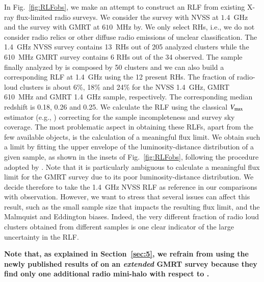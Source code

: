 \documentclass[useAMS,usenatbib]{mn2e}
\begin{document}
\begin{appendix}
In Fig.~\ref{fig:RLFobs}, we make an attempt to construct an RLF from existing
X-ray flux-limited radio surveys. We consider the
\cite{1999NewA....4..141G} survey with NVSS at $1.4$~GHz and the
\cite{VenturiGMRT_1,VenturiGMRT_2} survey with GMRT at $610$~MHz by. We only
select RHs, i.e., we do not consider radio relics or other diffuse radio
emissions of unclear classification. The 1.4~GHz NVSS survey contains 13~RHs out
of 205 analyzed clusters while the 610~MHz GMRT survey contains 6 RHs out of the
34 observed. The sample finally analyzed by \cite{VenturiGMRT_1,VenturiGMRT_2}
is composed by 50 clusters and we can also build a corresponding RLF at 1.4~GHz
using the 12 present RHs. The fraction of radio-loud clusters is about 6\%, 18\%
and 24\% for the NVSS 1.4~GHz, GMRT 610~MHz and GMRT 1.4~GHz sample,
respectively. The corresponding median redshift is 0.18, 0.26 and 0.25. We
calculate the RLF using the classical $V_{{\mathrm{max}}}$ estimator (e.g.,
\citealp{1976ApJ...207..700F}) correcting for the sample incompleteness and
survey sky coverage. The most problematic aspect in obtaining these RLFs, apart
from the few available objects, is the calculation of a meaningful flux
limit. We obtain such a limit by fitting the upper envelope of the
luminosity-distance distribution of a given sample, as shown in the insets of
Fig.~\ref{fig:RLFobs}, following the procedure adopted by
\cite{2011arXiv1106.5494B}. Note that it is particularly ambiguous to calculate
a meaningful flux limit for the GMRT survey due to its poor luminosity-distance
distribution. We decide therefore to take the 1.4~GHz NVSS RLF as reference in
our comparisons with observation. However, we want to stress that several issues
can affect this result, such as the small sample size that impacts the resulting
flux limit, and the Malmquist and Eddington biases. Indeed, the very different
fraction of radio loud clusters obtained from different samples is one clear
indicator of the large uncertainty in the RLF. 

{\bf Note that, as explained in 
Section~\ref{sec:5}, we refrain from using the newly published results of \cite{2013arXiv1306.3102K} 
on an \emph{extended} GMRT survey because they find only one additional radio 
mini-halo with respect to \cite{VenturiGMRT_1,VenturiGMRT_2}.}



\end{appendix}
\end{document}
